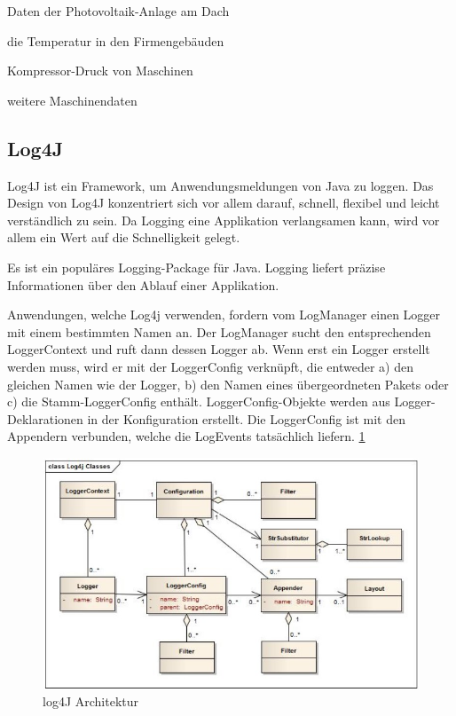 \begin{compactitem}
    \item Daten der Photovoltaik-Anlage am Dach
    \item die Temperatur in den Firmengebäuden
    \item Kompressor-Druck von Maschinen
    \item weitere Maschinendaten
\end{compactitem}

\subsection{Log4J}
Log4J ist ein Framework, um Anwendungsmeldungen von Java zu loggen.
Das Design von Log4J konzentriert sich vor allem darauf, schnell, flexibel und leicht verständlich zu sein. Da Logging eine Applikation verlangsamen kann, wird vor allem ein Wert auf die Schnelligkeit gelegt. \cite{log4JBuch} 

Es ist ein populäres Logging-Package für Java. Logging liefert präzise Informationen über den Ablauf einer Applikation. \cite{log4J}


Anwendungen, welche Log4j verwenden, fordern vom LogManager einen Logger mit einem bestimmten Namen an. Der LogManager sucht den entsprechenden LoggerContext und ruft dann dessen Logger ab. 
Wenn erst ein Logger erstellt werden muss, wird er mit der LoggerConfig verknüpft, die entweder a) den gleichen Namen wie der Logger, b) den Namen eines übergeordneten Pakets oder c) die Stamm-LoggerConfig enthält.
LoggerConfig-Objekte werden aus Logger-Deklarationen in der Konfiguration erstellt. Die LoggerConfig ist mit den Appendern verbunden, welche die LogEvents tatsächlich liefern. \ref{fig:impl:log4jArchitektur} \cite{log4J}

\begin{figure}[h t]
    \centering
    \includegraphics[scale=0.7]{pics/log4jArchitektur.jpg}
    \caption{log4J Architektur \cite{log4J}}
    \label{fig:impl:log4jArchitektur}
\end{figure}